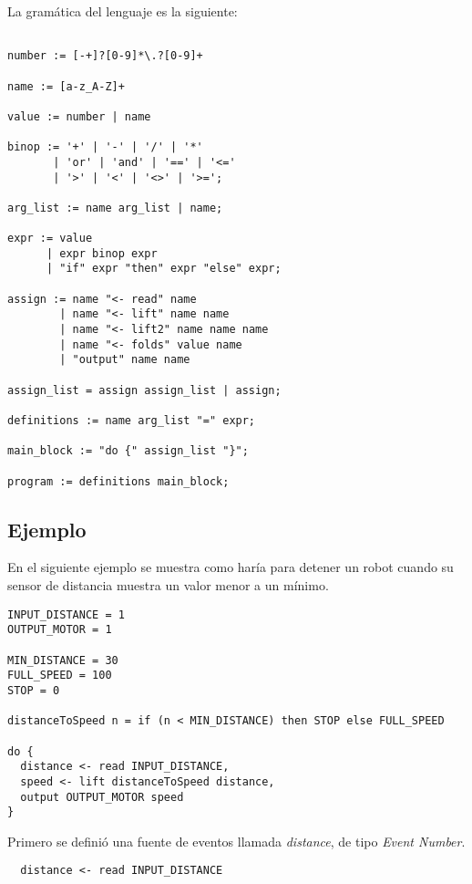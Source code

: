La gramática del lenguaje es la siguiente:

\begin{verbatim}

number := [-+]?[0-9]*\.?[0-9]+

name := [a-z_A-Z]+

value := number | name

binop := '+' | '-' | '/' | '*'
       | 'or' | 'and' | '==' | '<='
       | '>' | '<' | '<>' | '>=';

arg_list := name arg_list | name;

expr := value
      | expr binop expr
      | "if" expr "then" expr "else" expr;

assign := name "<- read" name
        | name "<- lift" name name
        | name "<- lift2" name name name
        | name "<- folds" value name
        | "output" name name

assign_list = assign assign_list | assign;

definitions := name arg_list "=" expr;

main_block := "do {" assign_list "}";

program := definitions main_block;

\end{verbatim}

\subsection{Ejemplo}

En el siguiente ejemplo se muestra como haría para detener un
robot cuando su sensor de distancia muestra un valor menor a un mínimo.

\begin{verbatim}
INPUT_DISTANCE = 1
OUTPUT_MOTOR = 1

MIN_DISTANCE = 30
FULL_SPEED = 100
STOP = 0

distanceToSpeed n = if (n < MIN_DISTANCE) then STOP else FULL_SPEED

do {
  distance <- read INPUT_DISTANCE,
  speed <- lift distanceToSpeed distance,
  output OUTPUT_MOTOR speed
}

\end{verbatim}

Primero se definió una fuente de eventos llamada \emph{distance},
de tipo \emph{Event Number}.

\begin{verbatim}
  distance <- read INPUT_DISTANCE
\end{verbatim}


